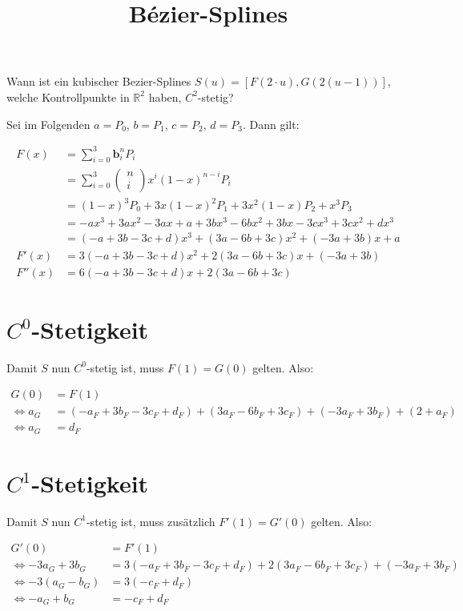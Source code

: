 \documentclass[a4paper]{scrartcl}
\begin{document}
    \title{Bézier-Splines}
    \maketitle

    Wann ist ein kubischer Bezier-Splines $S(u) = [F(2 \cdot u), G(2(u-1))]$,
    welche Kontrollpunkte in $\mathbb{R}^2$ haben, $C^2$-stetig?

    Sei im Folgenden $a = P_0$, $b = P_1$, $c = P_2$, $d= P_3$. Dann gilt:

    \begin{align}
        F(x) &= \sum_{i=0}^3 \mathbf{b}_i^n P_i\\
             &= \sum_{i=0}^3 \begin{pmatrix}n\\i\end{pmatrix} x^{i} (1-x)^{n-i}  P_i\\
             &= (1-x)^3 P_0 + 3 x (1-x)^2 P_1 + 3 x^2 (1-x) P_2 + x^3 P_3\\
             &= -a x^3+3 a x^2-3 a x+a+3 b x^3-6 b x^2+3 b x-3 c x^3+3 c x^2+d x^3\\
             &= (-a + 3 b-3 c+d) x^3  + (3 a-6 b+3 c) x^2 + (-3 a+3 b) x + a\\
        F'(x)&= 3 (-a + 3 b-3 c+d) x^2 + 2 (3 a-6 b+3 c) x + (-3 a+3 b)\\
        F''(x) &= 6 (-a + 3 b-3 c+d) x + 2 (3 a-6 b+3 c)
    \end{align}

    \section{$C^0$-Stetigkeit}
    Damit $S$ nun $C^0$-stetig ist, muss $F(1) = G(0)$ gelten. Also:

    \begin{align}
        G(0) &= F(1)\\
    \Leftrightarrow a_G
        &= (-a_F + 3 b_F-3 c_F+d_F)  + (3 a_F-6 b_F+3 c_F) + (-3 a_F+3 b_F) + (2+a_F)\\
    \Leftrightarrow a_G &= d_F
    \end{align}

    \clearpage
    \section{$C^1$-Stetigkeit}
    Damit $S$ nun $C^1$-stetig ist, muss zusätzlich $F'(1) = G'(0)$ gelten. Also:

    \begin{align}
        G'(0) &= F'(1)\\
    \Leftrightarrow -3 a_G+3 b_G
        &= 3 (-a_F + 3 b_F-3 c_F+d_F) + 2 (3 a_F-6 b_F+3 c_F) + (-3 a_F+3 b_F)\\
    \Leftrightarrow -3 (a_G-b_G) &= 3 (- c_F+d_F)\\
    \Leftrightarrow -a_G + b_G &= - c_F + d_F
    \end{align}
\end{document}
